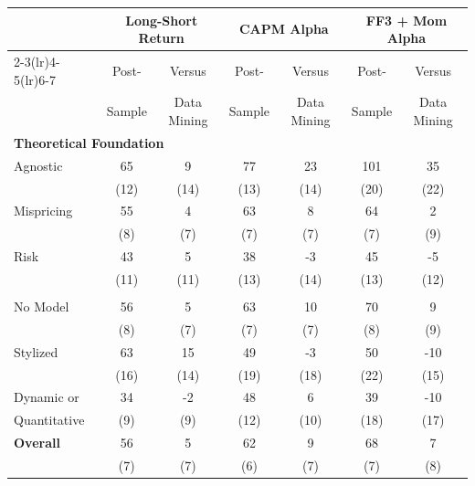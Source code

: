 \begin{tabular}{lcccccc}
   \toprule
   & \multicolumn{2}{c}{Long-Short Return} & \multicolumn{2}{c}{CAPM Alpha} & \multicolumn{2}{c}{FF3 + Mom Alpha} \\
   \cmidrule(lr){2-3}\cmidrule(lr){4-5}\cmidrule(lr){6-7}
   & Post- & \multicolumn{1}{c}{Versus} & Post- & \multicolumn{1}{c}{Versus} & Post- & \multicolumn{1}{c}{Versus} \\
   & Sample & \multicolumn{1}{c}{Data Mining} & Sample & \multicolumn{1}{c}{Data Mining} & Sample & \multicolumn{1}{c}{Data Mining} \\
   \midrule
   \multicolumn{7}{l}{\textbf{Theoretical Foundation}} \\
   Agnostic & 65 & 9 & 77 & 23 & 101 & 35 \\
   & (12) & (14) & (13) & (14) & (20) & (22) \\
   Mispricing & 55 & 4 & 63 & 8 & 64 & 2 \\
   & (8) & (7) & (7) & (7) & (7) & (9) \\
   Risk & 43 & 5 & 38 & -3 & 45 & -5 \\
   & (11) & (11) & (13) & (14) & (13) & (12) \\
   \addlinespace
   \multicolumn{7}{l}{\textbf{Equilibrium Modeling}} \\
   No Model & 56 & 5 & 63 & 10 & 70 & 9 \\
   & (8) & (7) & (7) & (7) & (8) & (9) \\
   Stylized & 63 & 15 & 49 & -3 & 50 & -10 \\
   & (16) & (14) & (19) & (18) & (22) & (15) \\
   Dynamic or & 34 & -2 & 48 & 6 & 39 & -10 \\
   Quantitative & (9) & (9) & (12) & (10) & (18) & (17) \\
   \addlinespace
   \textbf{Overall} & 56 & 5 & 62 & 9 & 68 & 7 \\
   & (7) & (7) & (6) & (7) & (7) & (8) \\
   \bottomrule
\end{tabular}
